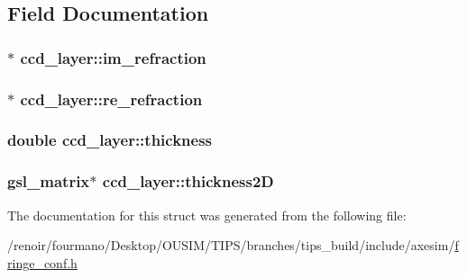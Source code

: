 \subsection{Field Documentation}
\hypertarget{structccd__layer_a893d59ee0cd5db8abd32b4259a0a7484}{
\subsubsection[{im\_\-refraction}]{$\ast$ {\bf ccd\_\-layer::im\_\-refraction}}}
\label{structccd__layer_a893d59ee0cd5db8abd32b4259a0a7484}
\hypertarget{structccd__layer_add2149e5c5ee94567c955b2cd82c7e92}{
\subsubsection[{re\_\-refraction}]{$\ast$ {\bf ccd\_\-layer::re\_\-refraction}}}
\label{structccd__layer_add2149e5c5ee94567c955b2cd82c7e92}
\hypertarget{structccd__layer_a8bada4a0ff9e515bd8c177644d72af1a}{
\subsubsection[{thickness}]{\setlength{\rightskip}{0pt plus 5cm}double {\bf ccd\_\-layer::thickness}}}
\label{structccd__layer_a8bada4a0ff9e515bd8c177644d72af1a}
\hypertarget{structccd__layer_a831ea82c1e042d7fc58c507b682a32b0}{
\subsubsection[{thickness2D}]{\setlength{\rightskip}{0pt plus 5cm}gsl\_\-matrix$\ast$ {\bf ccd\_\-layer::thickness2D}}}
\label{structccd__layer_a831ea82c1e042d7fc58c507b682a32b0}


The documentation for this struct was generated from the following file:\begin{DoxyCompactItemize}
\item 
/renoir/fourmano/Desktop/OUSIM/TIPS/branches/tips\_\-build/include/axesim/\hyperlink{fringe__conf_8h}{fringe\_\-conf.h}\end{DoxyCompactItemize}
